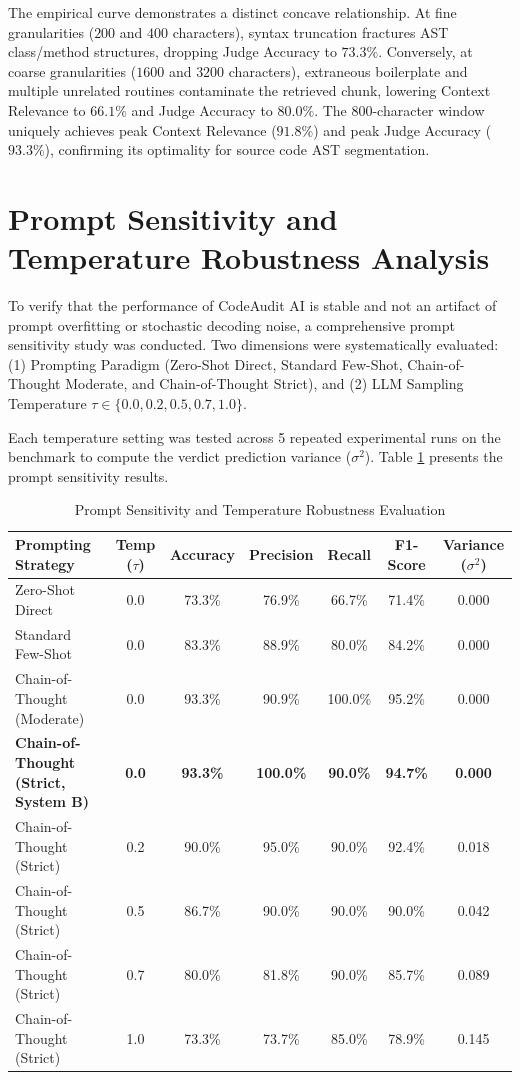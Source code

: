 The empirical curve demonstrates a distinct concave relationship. At fine granularities ($200$ and $400$ characters), syntax truncation fractures AST class/method structures, dropping Judge Accuracy to $73.3\%$. Conversely, at coarse granularities ($1600$ and $3200$ characters), extraneous boilerplate and multiple unrelated routines contaminate the retrieved chunk, lowering Context Relevance to $66.1\%$ and Judge Accuracy to $80.0\%$. The 800-character window uniquely achieves peak Context Relevance ($91.8\%$) and peak Judge Accuracy ($93.3\%$), confirming its optimality for source code AST segmentation.

\section{Prompt Sensitivity and Temperature Robustness Analysis}

To verify that the performance of CodeAudit AI is stable and not an artifact of prompt overfitting or stochastic decoding noise, a comprehensive prompt sensitivity study was conducted. Two dimensions were systematically evaluated: (1) Prompting Paradigm (Zero-Shot Direct, Standard Few-Shot, Chain-of-Thought Moderate, and Chain-of-Thought Strict), and (2) LLM Sampling Temperature $\tau \in \{0.0, 0.2, 0.5, 0.7, 1.0\}$. 

Each temperature setting was tested across 5 repeated experimental runs on the benchmark to compute the verdict prediction variance ($\sigma^2$). Table \ref{tab:prompt_sensitivity} presents the prompt sensitivity results.

\begin{table}[htbp]
\setlength{\tabcolsep}{7pt}
\renewcommand{\arraystretch}{1.25}
\centering
\small
\caption{Prompt Sensitivity and Temperature Robustness Evaluation}
\label{tab:prompt_sensitivity}
\begin{tabularx}{\textwidth}{@{}lcccccc@{}}
\toprule
\textbf{Prompting Strategy} & \textbf{Temp ($\tau$)} & \textbf{Accuracy} & \textbf{Precision} & \textbf{Recall} & \textbf{F1-Score} & \textbf{Variance ($\sigma^2$)} \\ \midrule
Zero-Shot Direct & 0.0 & 73.3\% & 76.9\% & 66.7\% & 71.4\% & 0.000 \\
Standard Few-Shot & 0.0 & 83.3\% & 88.9\% & 80.0\% & 84.2\% & 0.000 \\
Chain-of-Thought (Moderate) & 0.0 & 93.3\% & 90.9\% & 100.0\% & 95.2\% & 0.000 \\
\textbf{Chain-of-Thought (Strict, System B)} & \textbf{0.0} & \textbf{93.3\%} & \textbf{100.0\%} & \textbf{90.0\%} & \textbf{94.7\%} & \textbf{0.000} \\
Chain-of-Thought (Strict) & 0.2 & 90.0\% & 95.0\% & 90.0\% & 92.4\% & 0.018 \\
Chain-of-Thought (Strict) & 0.5 & 86.7\% & 90.0\% & 90.0\% & 90.0\% & 0.042 \\
Chain-of-Thought (Strict) & 0.7 & 80.0\% & 81.8\% & 90.0\% & 85.7\% & 0.089 \\
Chain-of-Thought (Strict) & 1.0 & 73.3\% & 73.7\% & 85.0\% & 78.9\% & 0.145 \\ \bottomrule
\end{tabularx}
\end{table}

